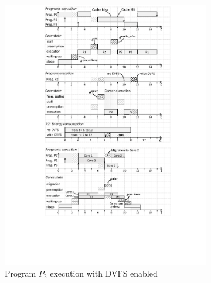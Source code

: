 \begin{figure}
\begin{minipage}{.75\columnwidth}
\begin{subfigure}[t]{\linewidth}
\includegraphics[width=\linewidth]{figs/DVFSExample.pdf}
\caption{Program $P_2$ execution with DVFS enabled}
\vspace{3mm}
\label{fig:DVFSExample}
\end{subfigure}
\begin{subfigure}[t]{\linewidth}

\end{subfigure}
\end{minipage}
\end{figure}
